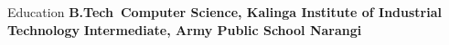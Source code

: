 \begin{rubric}{Education}
\entry*[2022-2026]%
	\textbf{B.Tech~Computer Science, Kalinga Institute of Industrial Technology}
%
\entry*[2022]%
	\textbf{Intermediate, Army Public School Narangi}
% 
\end{rubric}